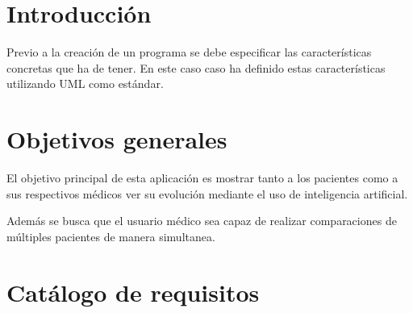 \newcommand{\cu}[9]{
    \begin{table}[p]
        \centering
        \begin{tabularx}{\linewidth}{ p{0.21\columnwidth} p{0.71\columnwidth} }
            \toprule
            \textbf{CU-#1} & \textbf{#2} \\
            \toprule
            \textbf{Versión} & 1.0 \\
            \textbf{Autor} & \theauthor \\
            \textbf{Requisitos asociados} & #3 \\
            \textbf{Descripción} & #4 \\
            \textbf{Precondición} & #5 \\
            \textbf{Acciones} & #6 \\
            \textbf{Postcondición} & #7 \\
            \textbf{Excepciones} & #8 \\
			\textbf{Importancia} & #9 \\
            \bottomrule
        \end{tabularx}
        \caption{CU-#1 #2.}
    \end{table}
}


\section{Introducción}
Previo a la creación de un programa se debe especificar las características concretas que ha de tener.
En este caso caso ha definido estas características utilizando UML como estándar.



\section{Objetivos generales}
El objetivo principal de esta aplicación es mostrar tanto a los pacientes como a sus respectivos médicos ver su evolución mediante el uso de inteligencia artificial.

Además se busca que el usuario médico sea capaz de realizar comparaciones de múltiples pacientes de manera simultanea.

\section{Catálogo de requisitos}
